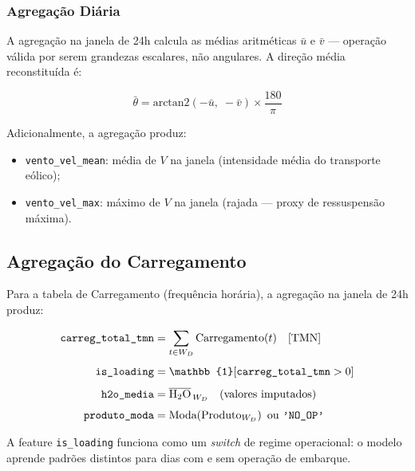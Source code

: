 \documentclass[12pt, a4paper]{article}
\newcommand{\feature}[1]{\texttt{#1}}
\begin{document}
\subsubsection{Agregação Diária}

A agregação na janela de 24h calcula as médias aritméticas $\bar{u}$ e
$\bar{v}$ — operação válida por serem grandezas escalares, não angulares.
A direção média reconstituída é:

\begin{equation}
    \bar{\theta} = \text{arctan2}(-\bar{u},\; -\bar{v}) \times
    \frac{180}{\pi}
    \label{eq:dir_media}
\end{equation}

Adicionalmente, a agregação produz:
\begin{itemize}[noitemsep]
    \item \feature{vento\_vel\_mean}: média de $V$ na janela (intensidade
          média do transporte eólico);
    \item \feature{vento\_vel\_max}: máximo de $V$ na janela (rajada —
          proxy de ressuspensão máxima).
\end{itemize}

\subsection{Agregação do Carregamento}
\label{subsec:agreg_carreg}

Para a tabela de Carregamento (frequência horária), a agregação na janela
de 24h produz:

\begin{equation}
    \begin{aligned}
    \feature{carreg\_total\_tmn} &= \sum_{t \in W_D}
        \text{Carregamento}(t) \quad \text{[\si{TMN}]} \\[4pt]
    \feature{is\_loading} &= \mathbb{1}\!\left[
        \feature{carreg\_total\_tmn} > 0\right] \\[4pt]
    \feature{h2o\_media} &= \overline{\text{H}_2\text{O}}_{\,W_D}
        \quad \text{(valores imputados)} \\[4pt]
    \feature{produto\_moda} &= \text{Moda}\!\left(
        \text{Produto}_{W_D}\right) \text{ ou } \texttt{'NO\_OP'}
    \end{aligned}
    \label{eq:carreg_agreg}
\end{equation}

A feature \feature{is\_loading} funciona como um \textit{switch} de regime
operacional: o modelo aprende padrões distintos para dias com e sem
operação de embarque.
\end{document}
